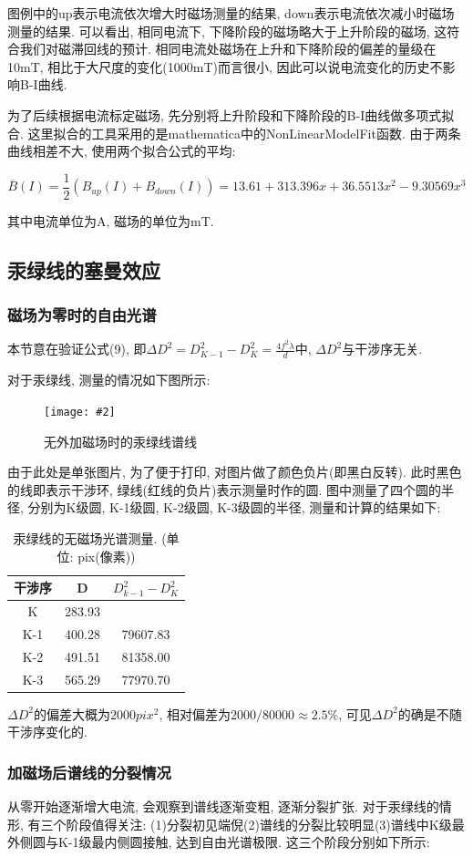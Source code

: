 \documentclass[12pt,a4paper]{article}
\newcommand{\be}[1]{
    \begin{equation}
        #1
    \end{equation}
}
\newcommand{\bfig}[3]{
    \begin{figure}[H]
        \centering
        \texttt{[image: \#2]}
        \caption{#3}
    \end{figure}
}
\begin{document}
图例中的up表示电流依次增大时磁场测量的结果, down表示电流依次减小时磁场测量的结果. 可以看出, 相同电流下, 下降阶段的磁场略大于上升阶段的磁场, 
这符合我们对磁滞回线的预计. 相同电流处磁场在上升和下降阶段的偏差的量级在10mT, 相比于大尺度的变化(1000mT)而言很小, 因此可以说电流变化的历史不影响B-I曲线. 

为了后续根据电流标定磁场, 先分别将上升阶段和下降阶段的B-I曲线做多项式拟合. 这里拟合的工具采用的是mathematica中的NonLinearModelFit函数. 
由于两条曲线相差不大, 使用两个拟合公式的平均: 
\be{\overline{B}(I)=\frac{1}{2}(B_{up}(I)+B_{down}(I))=13.61 + 313.396 x + 36.5513 x^2 - 9.30569 x^3}
其中电流单位为A, 磁场的单位为mT.
\subsection{汞绿线的塞曼效应}
\subsubsection{磁场为零时的自由光谱}
本节意在验证公式(9), 即$\Delta{D}^2=D_{K-1}^2-D_{K}^2=\frac{4f^2\lambda}{d}$中, $\Delta{D}^2$与干涉序无关. 

对于汞绿线, 测量的情况如下图所示: 
\bfig{0.6}{free_g_measure.png}{无外加磁场时的汞绿线谱线}
由于此处是单张图片, 为了便于打印, 对图片做了颜色负片(即黑白反转). 此时黑色的线即表示干涉环, 绿线(红线的负片)表示测量时作的圆. 
图中测量了四个圆的半径, 分别为K级圆, K-1级圆, K-2级圆, K-3级圆的半径, 测量和计算的结果如下: 

\begin{table}[H]
    \centering
    \begin{tabular}{|c|c|c|}
    \hline
    干涉序    & D      & $D_{k-1}^2-D_K^2$  \\ \hline
    K   & 283.93 &          \\ \hline
    K-1 & 400.28 & 79607.83 \\ \hline
    K-2 & 491.51 & 81358.00 \\ \hline
    K-3 & 565.29 & 77970.70 \\ \hline
    \end{tabular}
    \caption{汞绿线的无磁场光谱测量. (单位: pix(像素))}
    \end{table}
$\Delta D^2$的偏差大概为$2000pix^2$, 相对偏差为$2000/80000\approx 2.5\%$, 可见$\Delta D^2$的确是不随干涉序变化的. 

\subsubsection{加磁场后谱线的分裂情况}
从零开始逐渐增大电流, 会观察到谱线逐渐变粗, 逐渐分裂扩张. 对于汞绿线的情形, 有三个阶段值得关注: (1)分裂初见端倪(2)谱线的分裂比较明显(3)谱线中K级最外侧圆与K-1级最内侧圆接触, 达到自由光谱极限. 
这三个阶段分别如下所示: 
\end{document}
